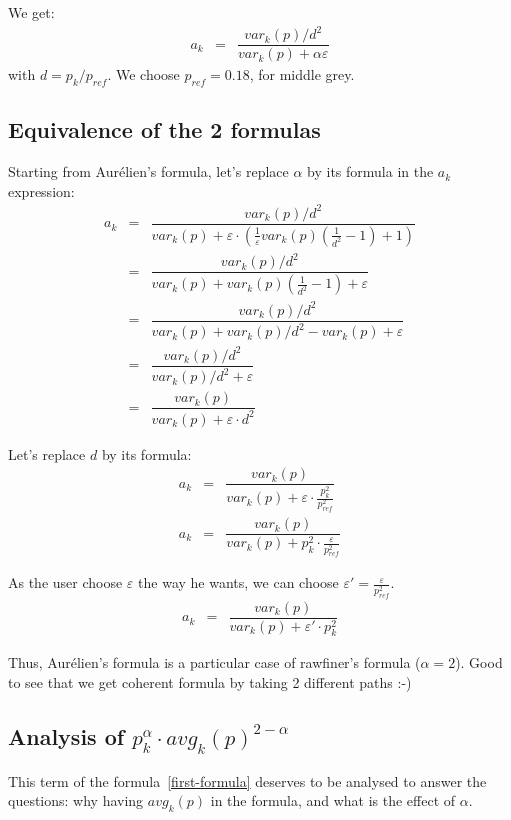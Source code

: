 \documentclass[12pt,a4paper]{article}
\begin{document}
We get:
\begin{eqnarray}
a_k &=& \dfrac{var_k(p)/d^2}{var_k(p) + \alpha \varepsilon}
\end{eqnarray}
with $d = p_k / p_{ref}$. We choose $p_{ref} = 0.18$, for middle grey.

\subsection{Equivalence of the 2 formulas}
Starting from Aurélien's formula, let's replace $\alpha$ by its formula in the $a_k$ expression:
\begin{eqnarray}
a_k &=& \dfrac{var_k(p)/d^2}{var_k(p) + \varepsilon  \cdot  (\frac{1}{\varepsilon} var_k(p)  \left( \frac{1}{d^2} - 1\right) + 1)}\\
&=& \dfrac{var_k(p)/d^2}{var_k(p) + var_k(p)  \left( \frac{1}{d^2} - 1\right) + \varepsilon}\\
&=& \dfrac{var_k(p)/d^2}{var_k(p) + var_k(p)/d^2  - var_k(p) + \varepsilon}\\
&=& \dfrac{var_k(p)/d^2}{var_k(p)/d^2 + \varepsilon}\\
&=& \dfrac{var_k(p)}{var_k(p) + \varepsilon \cdot d^2}
\end{eqnarray}

Let's replace $d$ by its formula:
\begin{eqnarray}
a_k &=&\dfrac{var_k(p)}{var_k(p) + \varepsilon \cdot \frac{p_k^2}{p_{ref}^2}}\\
a_k &=&\dfrac{var_k(p)}{var_k(p) + p_k^2 \cdot \frac{\varepsilon}{p_{ref}^2}}
\end{eqnarray}

As the user choose $\varepsilon$ the way he wants, we can choose
$\varepsilon'=\frac{\varepsilon}{p_{ref}^2}$.
\begin{eqnarray}
a_k &=&\dfrac{var_k(p)}{var_k(p) + \varepsilon'  \cdot  p_k^2}
\end{eqnarray}

Thus, Aurélien's formula is a particular case of rawfiner's formula ($\alpha = 2$). Good to see that we get coherent formula by taking 2 different paths :-)

\subsection{Analysis of $p_k ^ {\alpha}  \cdot  avg_k(p) ^ {2-\alpha}$}
This term of the formula~\ref{first-formula} deserves to be analysed to answer the questions: why having $avg_k(p)$ in the formula, and what is the effect of $\alpha$.
\end{document}
